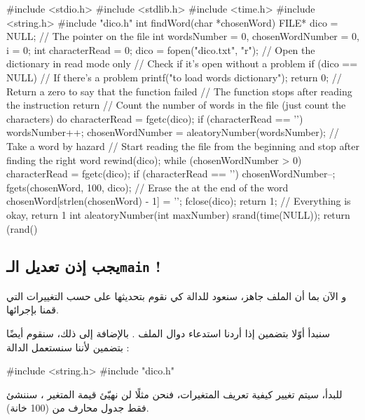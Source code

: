 \begin{Csource}
#include <stdio.h>
#include <stdlib.h>
#include <time.h>
#include <string.h>
#include "dico.h"
int findWord(char *chosenWord)
{
    FILE* dico = NULL; // The pointer on the file
    int wordsNumber = 0, chosenWordNumber = 0, i = 0;
    int characterRead = 0;
    dico = fopen("dico.txt", "r"); // Open the dictionary in read mode only
    // Check if it's open without a problem
    if (dico == NULL) // If there's a problem
    {
        printf("\nImpossible to load words dictionary");
        return 0; // Return a zero to say that the function failed
        // The function stops after reading the instruction return
    }
    // Count the number of words in the file (just count the \n characters)
    do
    {
        characterRead = fgetc(dico);
        if (characterRead == '\n')
            wordsNumber++;
    }
    chosenWordNumber = aleatoryNumber(wordsNumber); // Take a word by hazard
    // Start reading the file from the beginning and stop after finding the right word
    rewind(dico);
    while (chosenWordNumber > 0)
    {
        characterRead = fgetc(dico);
        if (characterRead == '\n')
            chosenWordNumber--;
    }
    fgets(chosenWord, 100, dico);
    // Erase the \n at the end of the word
    chosenWord[strlen(chosenWord) - 1] = '\0';
    fclose(dico);
    return 1; // Everything is okay, return 1
}
int aleatoryNumber(int maxNumber)
{
    srand(time(NULL));
    return (rand() %
}
\end{Csource}

\subsection{يجب إذن تعديل الـ\texttt{main}
!}

و الآن بما أن الملف
جاهز، سنعود للدالة
كي نقوم بتحديثها على حسب التغييرات التي قمنا بإجرائها.

سنبدأ أوّلا بتضمين
إذا أردنا استدعاء دوال الملف
.
بالإضافة إلى ذلك، سنقوم أيضًا بتضمين
لأننا سنستعمل الدالة
:

\begin{Csource}
#include <string.h>
#include "dico.h"
\end{Csource}

للبدأ، سيتم تغيير كيفية تعريف المتغيرات، فنحن مثلًا لن نهيّئ قيمة المتغير
،
سننشئ فقط جدول محارف من
(100 خانة).

